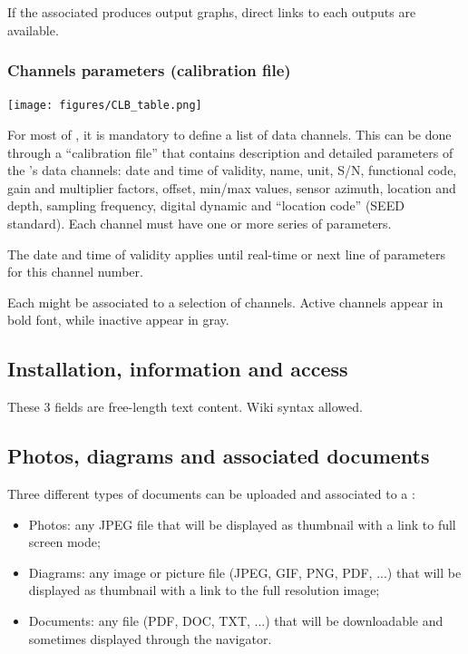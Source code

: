 If the associated  produces output graphs, direct links to each outputs are available.


\subsubsection{Channels parameters (calibration file)}
\label{clb}

\texttt{[image: figures/CLB\_table.png]}

For most of , it is mandatory to define a list of data channels. This can be done through a ``calibration file'' that contains description and detailed parameters of the 's data channels: date and time of validity, name, unit, S/N, functional code, gain and multiplier factors, offset, min/max values, sensor azimuth, location and depth, sampling frequency, digital dynamic and ``location code'' (SEED standard). Each channel must have one or more series of parameters. 

The date and time of validity applies until real-time or next line of parameters for this channel number.

Each  might be associated to a selection of channels. Active channels appear in bold font, while inactive appear in gray.


\subsection{Installation, information and access}

These 3 fields are free-length text content. Wiki syntax allowed.

\subsection{Photos, diagrams and associated documents}

Three different types of documents can be uploaded and associated to a :
\begin{itemize}
	\item Photos: any JPEG file that will be displayed as thumbnail with a link to full screen mode;
	\item Diagrams: any image or picture file (JPEG, GIF, PNG, PDF, ...) that will be displayed as thumbnail with a link to the full resolution image;
	\item Documents: any file (PDF, DOC, TXT, ...) that will be downloadable and sometimes displayed through the navigator.
\end{itemize}


